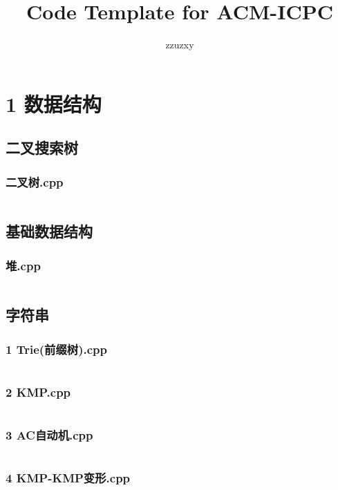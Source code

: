\documentclass{article}
\title{Code Template for ACM-ICPC}
\author{zzuzxy}
\begin{document}
\begin{titlepage}
\maketitle
\thispagestyle{empty}
\pagebreak
\pagestyle{plain}
\tableofcontents
\end{titlepage}
\section{1 数据结构}
\subsection{二叉搜索树}
\subsubsection{二叉树.cpp}
\inputminted{c++}{/home/zzuzxy/t2/ACM-template/1 数据结构/二叉搜索树/二叉树.cpp}
\subsection{基础数据结构}
\subsubsection{堆.cpp}
\inputminted{c++}{/home/zzuzxy/t2/ACM-template/1 数据结构/基础数据结构/堆.cpp}
\subsection{字符串}
\subsubsection{1 Trie(前缀树).cpp}
\inputminted{c++}{/home/zzuzxy/t2/ACM-template/1 数据结构/字符串/1 Trie(前缀树).cpp}
\subsubsection{2 KMP.cpp}
\inputminted{c++}{/home/zzuzxy/t2/ACM-template/1 数据结构/字符串/2 KMP.cpp}
\subsubsection{3 AC自动机.cpp}
\inputminted{c++}{/home/zzuzxy/t2/ACM-template/1 数据结构/字符串/3 AC自动机.cpp}
\subsubsection{4 KMP-KMP变形.cpp}
\inputminted{c++}{/home/zzuzxy/t2/ACM-template/1 数据结构/字符串/4 KMP-KMP变形.cpp}
\end{document}
